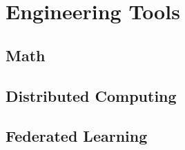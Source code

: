 \documentclass[../mthe-493-final-project.tex]{subfiles}
\begin{document}
    \chapter{Engineering Tools}
    \label{ch:engineering-tools}

    \section{Math}
    \label{sec:Math}
    \section{Distributed Computing}
    \label{sec:Distributed-Computing}
    \section{Federated Learning}
    \label{sec:Federate-Learning}
\end{document}
